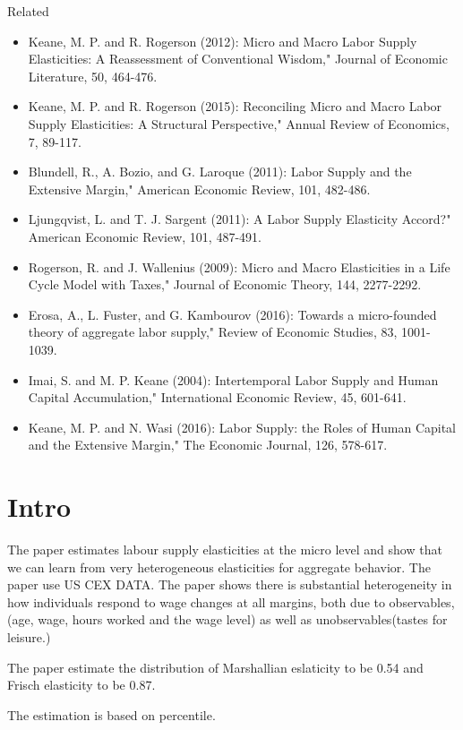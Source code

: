\cite{Attanasio2015AggregatingSupply}
Related 
\begin{itemize}
    \item  Keane, M. P. and R. Rogerson (2012): Micro and Macro Labor Supply Elasticities: A Reassessment of Conventional Wisdom," Journal of Economic Literature, 50, 464-476.
    \item Keane, M. P. and R. Rogerson (2015): Reconciling Micro and Macro Labor Supply Elasticities: A Structural Perspective," Annual Review of Economics, 7, 89-117. 
    \item Blundell, R., A. Bozio, and G. Laroque (2011): Labor Supply and the Extensive Margin," American Economic Review, 101, 482-486.
    \item Ljungqvist, L. and T. J. Sargent (2011): A Labor Supply Elasticity Accord?" American Economic Review, 101, 487-491.
    \item Rogerson, R. and J. Wallenius (2009): Micro and Macro Elasticities in a Life Cycle Model with Taxes," Journal of Economic Theory, 144, 2277-2292.
    \item Erosa, A., L. Fuster, and G. Kambourov (2016): Towards a micro-founded theory of aggregate labor supply," Review of Economic Studies, 83, 1001-1039.
    \item Imai, S. and M. P. Keane (2004): Intertemporal Labor Supply and Human Capital Accumulation," International Economic Review, 45, 601-641.
    \item Keane, M. P. and N. Wasi (2016): Labor Supply: the Roles of Human Capital and the Extensive Margin," The Economic Journal, 126, 578-617.
\end{itemize}
\section{Intro}
The paper estimates labour supply elasticities at the micro level and show that we can learn from very heterogeneous elasticities for aggregate behavior.
The paper use US CEX DATA.
The paper shows there is substantial heterogeneity in how individuals respond to wage changes at all margins, both due to observables,(age, wage, hours worked and the wage level) as well as unobservables(tastes for leisure.)

The paper estimate the distribution of Marshallian eslaticity to be 0.54 and Frisch elasticity to be 0.87.

The estimation is based on percentile.


